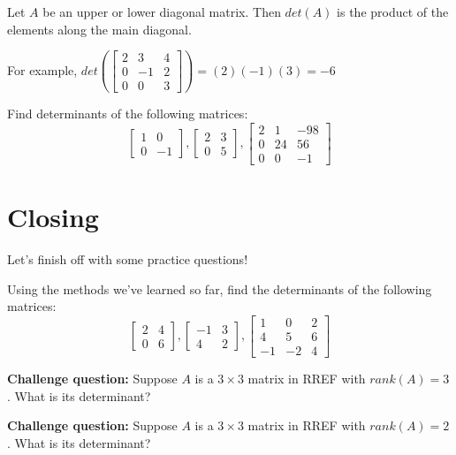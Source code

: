 \documentclass[11pt]{exam}
\begin{document}
    Let $A$ be an upper or lower diagonal matrix. Then $det(A)$ is the product of the elements along the main diagonal.

    For example, $det(\begin{bmatrix} 2 & 3 & 4 \\ 0 & -1 & 2 \\ 0 & 0 & 3 \end{bmatrix}) = (2)(-1)(3) = -6$

    \begin{questions}
        \item Find determinants of the following matrices:
        $$\begin{bmatrix} 1 & 0 \\ 0 & -1 \end{bmatrix},
        \begin{bmatrix} 2 & 3 \\ 0 & 5 \end{bmatrix},
        \begin{bmatrix} 2 & 1 & -98 \\ 0 & 24 & 56 \\ 0 & 0 & -1 \end{bmatrix}$$
    \end{questions}

    \pagebreak
    \section{Closing}
    Let's finish off with some practice questions!
    \begin{questions}
        \item Using the methods we've learned so far, find the determinants of the following matrices:
        $$\begin{bmatrix} 2 & 4 \\ 0 & 6 \end{bmatrix},
          \begin{bmatrix} -1 & 3 \\ 4 & 2 \end{bmatrix},
          \begin{bmatrix} 1 & 0 & 2 \\ 4 & 5 & 6 \\ -1 & -2 & 4 \end{bmatrix}$$
        \item \textbf{Challenge question:} Suppose $A$ is a $3 \times 3$ matrix in RREF with $rank(A) = 3$. What is its determinant?
        \item \textbf{Challenge question:} Suppose $A$ is a $3 \times 3$ matrix in RREF with $rank(A) = 2$. What is its determinant?
    \end{questions}
\end{document}
